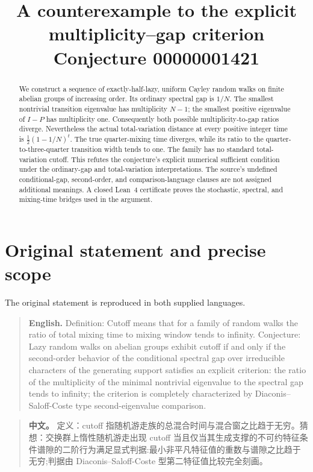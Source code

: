 \documentclass[11pt,a4paper]{article}
\title{\vspace{-1.4em}\textbf{A counterexample to the explicit\\ multiplicity--gap criterion}\\[0.4em]
  \large Conjecture 00000001421}
\author{}
\date{}
\theoremstyle{definition}
\theoremstyle{remark}
\begin{document}
\maketitle
\vspace{-2.2em}

\begin{abstract}
We construct a sequence of exactly-half-lazy, uniform Cayley random walks on
finite abelian groups of increasing order. Its ordinary spectral gap is
$1/N$. The smallest nontrivial transition eigenvalue has multiplicity $N-1$;
the smallest positive eigenvalue of $I-P$ has multiplicity one. Consequently
both possible multiplicity-to-gap ratios diverge. Nevertheless the actual
total-variation distance at every positive integer time is
$\tfrac12(1-1/N)^t$. The true quarter-mixing time diverges, while its ratio to
the quarter-to-three-quarter transition width tends to one. The family has
no standard total-variation cutoff. This refutes the conjecture's explicit
numerical sufficient condition under the ordinary-gap and total-variation
interpretations. The source's undefined conditional-gap, second-order, and
comparison-language clauses are not assigned additional meanings. A closed
Lean~4 certificate proves the stochastic, spectral, and mixing-time bridges
used in the argument.
\end{abstract}

\section{Original statement and precise scope}

The original statement is reproduced in both supplied languages.

\begin{quote}\small
\textbf{English.} Definition: Cutoff means that for a family of random walks
the ratio of total mixing time to mixing window tends to infinity.
Conjecture: Lazy random walks on abelian groups exhibit cutoff if and only
if the second-order behavior of the conditional spectral gap over
irreducible characters of the generating support satisfies an explicit
criterion: the ratio of the multiplicity of the minimal nontrivial
eigenvalue to the spectral gap tends to infinity; the criterion is
completely characterized by Diaconis--Saloff-Coste type second-eigenvalue
comparison.
\end{quote}

\begin{quote}\small
\textbf{中文。} 定义：cutoff 指随机游走族的总混合时间与混合窗之比趋于无穷。猜想：交换群上惰性随机游走出现 cutoff 当且仅当其生成支撑的不可约特征条件谱隙的二阶行为满足显式判据:最小非平凡特征值的重数与谱隙之比趋于无穷;判据由 Diaconis–Saloff-Coste 型第二特征值比较完全刻画。
\end{quote}
\end{document}

